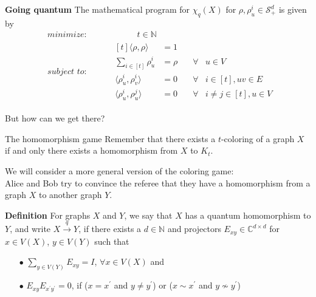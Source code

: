\documentclass[13.5pt]{beamer}
\begin{document}
\begin{frame}
\begin{block}{\color{colorblue}\textbf{Going quantum}}
The mathematical program for $\chi_q(X)$ for $\rho, \rho_u^i \in \mathcal{S}_+^d$ is given by
	\begin{equation*} 
	\begin{alignedat}{2}
	& \textit{minimize: } & &  \qquad \quad t \in \mathbb{N} \\
	& \textit{subject to: }& \quad   &\begin{aligned}[t] \langle \rho, \rho \rangle &  = 1  &  &  \\
	\sum\limits_{i\in [t]} \rho_{u}^i  & = \rho & \quad \forall &u \in V \\
	\langle \rho_{u}^i, \rho_{v}^i \rangle   & =0 & \quad \forall & i \in [t], uv \in E \\ 
	\langle \rho_{u}^i, \rho_{u}^j \rangle   & =0 & \quad \forall & i \neq j \in [t], u \in V
	\end{aligned}
	\end{alignedat}
	\end{equation*}
\vspace{0.5cm}
\end{block}
\pause
But how can we get there?
\end{frame}

\begin{frame}{The homomorphism game}
Remember that there exists a $t$-coloring of a graph $X$ if and only there exists a homomorphism from $X$ to $K_t$.\\ \vspace{0.3cm} \pause

We will consider a more general version of the coloring game:\\ 
Alice and Bob try to convince the referee that they have a homomorphism from a graph $X$ to another graph $Y$.

\end{frame}

\begin{frame}
\begin{block}{\color{colorblue}\textbf{Definition}}
For graphs $X$ and $Y$, we say that $X$ has a quantum homomorphism to $Y$, and write $X \overset{q}{\longrightarrow}Y$, if there exists a $d \in \mathbb{N}$ and projectors $E_{xy} \in \mathbb{C}^{d \times d}$ for $x \in V(X)$, $y\in V(Y)$ such that \pause
\begin{itemize}
\item[$\bullet$] $\sum_{y \in V(Y)}E_{xy} =I$, $\forall x \in V(X)$ and \\\pause \item[$\bullet$]$E_{xy}E_{x^{\prime}y^{\prime}} =0$, if ($x=x^\prime$ and $y \ne y^\prime$) or ($ x \sim x^\prime$ and $y \nsim y^\prime$)
\end{itemize}
\end{block}

\end{frame}
\end{document}
